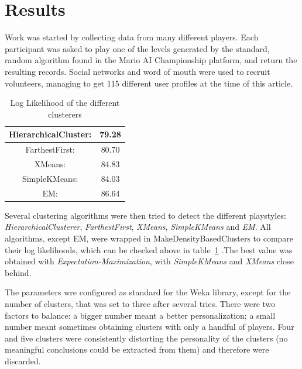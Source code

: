 \documentclass[conference]{IEEEtran}
\begin{document}
\section{Results}

Work was started by collecting data from many different players. Each participant was asked to play one of the levels generated by the standard, random algorithm found in the Mario AI Championship platform, and return the resulting records. Social networks and word of mouth were used to recruit volunteers, managing to get 115 different user profiles at the time of this article.


\begin{table}
\begin{center}
\renewcommand{\arraystretch}{1.3}
\caption{Log Likelihood of the different clusterers}
\label{tableloglikelihood}
\begin{tabular}{|c|c|}
\hline
HierarchicalCluster: & 79.28\\
\hline
FarthestFirst: & 80.70\\
\hline
XMeans: & 84.83 \\
\hline
SimpleKMeans: & 84.03 \\
\hline
EM: & 86.64 \\
\hline
\end{tabular}
\end{center}
\end{table}

Several clustering algorithms were then tried to detect the different playstyles: \textit{HierarchicalClusterer}, \textit{FarthestFirst}, \textit{XMeans}, \textit{SimpleKMeans} and \textit{EM}.
All algorithms, except EM, were wrapped in MakeDensityBasedClusters to compare their log likelihoods, which can be checked above in table~\ref{tableloglikelihood} .The best value was obtained with \textit{Expectation-Maximization}, with \textit{SimpleKMeans} and \textit{XMeans} close behind. 

The parameters wre configured as standard for the Weka library, except for the number of clusters, that was set to three after several tries. There were two factors to balance: a bigger number meant a better personalization; a small number meant sometimes obtaining clusters with only a handful of players. Four and five clusters were consistently distorting the personality of the clusters (no meaningful conclusions could be extracted from them) and therefore were discarded.
\end{document}
